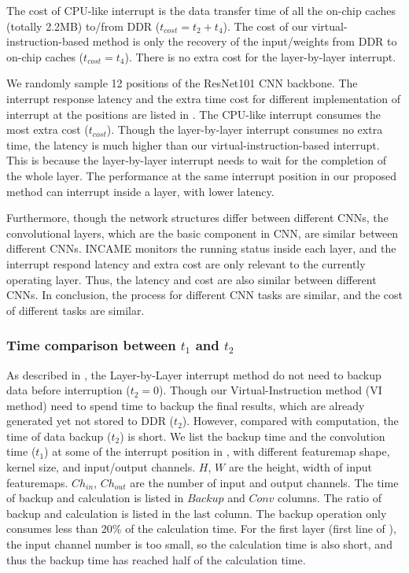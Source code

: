 The cost of CPU-like interrupt is the data transfer time of all the on-chip caches (totally 2.2MB) to/from DDR ($t_{cost} = t_2+t_4$). The cost of our virtual-instruction-based method is only the recovery of the input/weights from DDR to on-chip caches ($t_{cost} = t_4$). There is no extra cost for the layer-by-layer interrupt.



We randomly sample 12 positions of the ResNet101 CNN backbone. The interrupt response latency and the extra time cost for different implementation of interrupt at the positions are listed in .
The CPU-like interrupt consumes the most extra cost ($t_{cost}$). Though the layer-by-layer interrupt consumes no extra time, the latency is much higher than our virtual-instruction-based interrupt. 
This is because the layer-by-layer interrupt needs to wait for the completion of the whole layer. The performance at the same interrupt position in our proposed method can interrupt inside a layer, with lower latency.

Furthermore, though the network structures differ between different CNNs, the convolutional layers, which are the basic component in CNN, are similar between different CNNs. 
INCAME monitors the running status inside each layer, and the interrupt respond latency and extra cost are only relevant to the currently operating layer. Thus, the latency and cost are also similar between different CNNs. In conclusion, the process for different CNN tasks are similar, and the cost of different tasks are similar.

\subsubsection{ Time comparison between $t_1$ and $t_2$ }
\label{sec:expt1t2}
As described in , the Layer-by-Layer interrupt method do not need to backup data before interruption ($t_2 = 0$). Though our Virtual-Instruction method (VI method) need to spend time to backup the final results, which are already generated yet not stored to DDR ($t_2$). However, compared with computation, the time of data backup ($t_2$) is short. We list the backup time and the convolution time ($t_1$) at some of the interrupt position in , with different featuremap shape, kernel size, and input/output channels. $H$, $W$ are the height, width of input featuremaps. $Ch_{in}$, $Ch_{out}$ are the number of input and output channels. The time of backup and calculation is listed in $Backup$ and $Conv$ columns. The ratio of backup and calculation is listed in the last column. The backup operation only consumes less than 20\% of the calculation time. For the first layer (first line of ), the input channel number is too small, so the calculation time is also short, and thus the backup time has reached half of the calculation time. 

